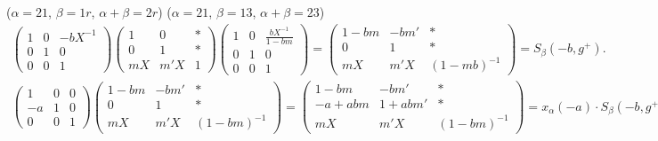 \documentclass[oneside, 8pt]{amsart}
\theoremstyle{remark}
\theoremstyle{definition}
\numberwithin{equation}{section}
\begin{document}
($\alpha = 21$, $\beta = 1r$, $\alpha + \beta = 2r$)
($\alpha = 21$, $\beta = 13$, $\alpha + \beta = 23$)
\begin{multline}
\left(\begin{array}{ccc} 
 1 & 0 & -bX^{-1} \\
 0 & 1 & 0 \\
 0 & 0 & 1 
 \end{array}\right)
\left(\begin{array}{ccc} 
 1 & 0 & * \\
 0 & 1 & * \\
 mX & m'X & 1 
 \end{array}\right)
 \left(\begin{array}{ccc} 
 1 & 0 & \frac{bX^{-1}}{1 - bm} \\
 0 & 1 & 0 \\
 0 & 0 & 1 
 \end{array}\right) = 
 \left(\begin{array}{ccc} 
 1 - bm & -bm' & * \\
 0 & 1 & * \\
 mX & m'X & (1 - mb)^{-1} 
 \end{array}\right) = S_\beta(-b, g^+).
\end{multline}
\begin{multline}
\left(\begin{array}{ccc} 
 1 & 0 & 0 \\
 -a & 1 & 0 \\
 0 & 0 & 1 
 \end{array}\right)
 \left(\begin{array}{ccc} 
 1 - bm & - bm' & * \\
 0 & 1 & * \\
 mX & m'X & (1 - bm)^{-1} 
 \end{array}\right) = 
 \left(\begin{array}{ccc} 
 1 - bm & - bm' & * \\
 - a + abm & 1 + abm' & * \\
 mX & m'X & (1 - bm)^{-1} 
 \end{array}\right) = x_\alpha(-a) \cdot S_\beta(-b, g^+)
\end{multline}
\end{document}
